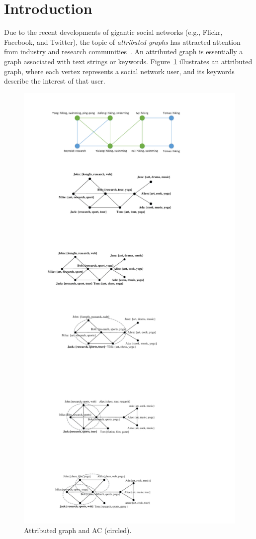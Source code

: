 \section{Introduction}
\label{intro}

Due to the recent developments of gigantic social networks (e.g., Flickr, Facebook, and Twitter), the topic of {\it attributed graphs} has attracted attention from industry and research communities~\cite{attr-topic-sigmod2012,keyword-icde2002,keyword-icde2007,keyword-sigmod2007,keyword-vldb2005,keyword-yu-2009,keyword-vldb2011,fang2014}.  An attributed graph is essentially a graph associated with text strings or keywords.  Figure~\ref{fig:motivation} illustrates an attributed graph, where each vertex represents a social network user, and its keywords describe the interest of that user.

\begin{figure}
	\small
	\centering
	\includegraphics[width=0.88\linewidth]{figures/motivation}
	\caption{Attributed graph and AC (circled).}
	\label{fig:motivation}
\end{figure}

